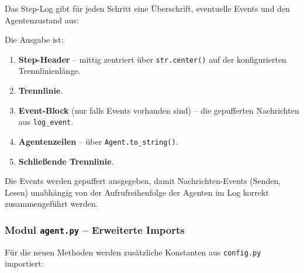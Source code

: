 Das Step-Log gibt für jeden Schritt eine Überschrift, eventuelle Events und den Agentenzustand aus:



Die Ausgabe ist:
\begin{enumerate}
    \item \textbf{Step-Header} – mittig zentriert über \texttt{str.center()} auf der konfigurierten Trennlinienlänge.
    \item \textbf{Trennlinie}.
    \item \textbf{Event-Block} (nur falls Events vorhanden sind) – die gepufferten Nachrichten aus \texttt{log\_event}.
    \item \textbf{Agentenzeilen} – über \texttt{Agent.to\_string()}.
    \item \textbf{Schließende Trennlinie}.
\end{enumerate}

Die Events werden gepuffert ausgegeben, damit Nachrichten-Events (Senden, Lesen) unabhängig von der Aufrufreihenfolge der Agenten im Log korrekt zusammengeführt werden.


\subsubsection{Modul \texttt{agent.py} – Erweiterte Imports}

Für die neuen Methoden werden zusätzliche Konstanten aus \texttt{config.py} importiert:



\begin{minipage}{\linewidth}
    \begin{minipage}[t]{0.48\textwidth}
        
    \end{minipage}\hfill
    \begin{minipage}[t]{0.48\textwidth}
        
    \end{minipage}%
    \vspace{-2\baselineskip}%
    \captionsetup{hypcap=false}%
    \label{lst:agent_imports_1c_II}%
\end{minipage}

